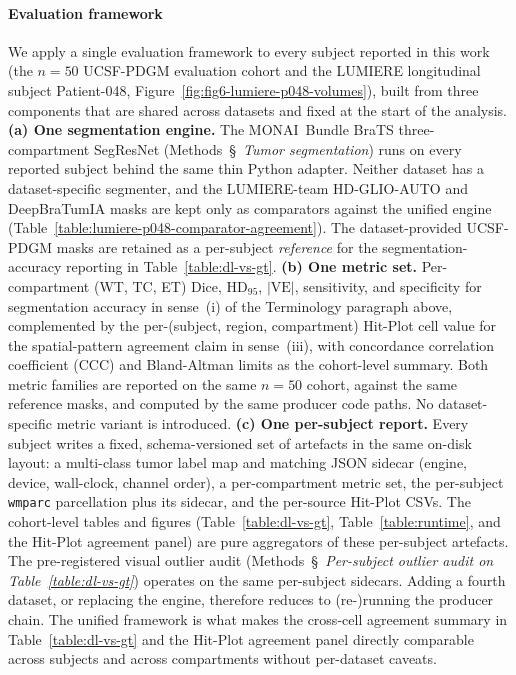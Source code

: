 \documentclass[a4paper,11pt,leqno]{article}
\begin{document}
\paragraph{Evaluation framework}

We apply a single evaluation framework to every subject reported
in this work (the $n=50$ UCSF-PDGM evaluation cohort and the LUMIERE
longitudinal subject Patient-048,
Figure~\ref{fig:fig6-lumiere-p048-volumes}), built from three
components that are shared across datasets and fixed at the start of
the analysis.
\textbf{(a) One segmentation engine.} The MONAI~Bundle BraTS
three-compartment SegResNet (Methods~\S~\emph{Tumor segmentation})
runs on every reported subject behind the same thin Python adapter. Neither dataset has a dataset-specific segmenter, and the
LUMIERE-team HD-GLIO-AUTO and DeepBraTumIA masks are kept only as
comparators against the unified engine
(Table~\ref{table:lumiere-p048-comparator-agreement}). The
dataset-provided UCSF-PDGM masks are retained as a per-subject
\emph{reference} for the segmentation-accuracy reporting in
Table~\ref{table:dl-vs-gt}.
\textbf{(b) One metric set.} Per-compartment (WT, TC, ET) Dice,
HD$_{95}$, $|\mathrm{VE}|$, sensitivity, and specificity for
segmentation accuracy in sense~(i) of the Terminology paragraph
above, complemented by the per-(subject, region, compartment)
Hit-Plot cell value for the spatial-pattern agreement claim in
sense~(iii), with concordance correlation coefficient (CCC) and
Bland-Altman limits as the cohort-level summary. Both metric
families are reported on the same $n=50$ cohort, against the same
reference masks, and computed by the same producer code paths. No dataset-specific metric variant is introduced.
\textbf{(c) One per-subject report.} Every subject writes a fixed,
schema-versioned set of artefacts in the same on-disk layout: a
multi-class tumor label map and matching JSON sidecar (engine,
device, wall-clock, channel order), a per-compartment metric set,
the per-subject \texttt{wmparc} parcellation plus its sidecar, and
the per-source Hit-Plot CSVs. The cohort-level tables and figures
(Table~\ref{table:dl-vs-gt}, Table~\ref{table:runtime}, and the
Hit-Plot agreement panel) are pure aggregators of these per-subject artefacts. The pre-registered visual outlier audit
(Methods~\S~\emph{Per-subject outlier audit on
Table~\ref{table:dl-vs-gt}}) operates on the same per-subject
sidecars. Adding a fourth dataset, or replacing the engine,
therefore reduces to (re-)running the producer chain. The unified
framework is what makes the cross-cell agreement summary in
Table~\ref{table:dl-vs-gt} and the Hit-Plot agreement panel directly
comparable across subjects and across compartments without
per-dataset caveats.
\end{document}
